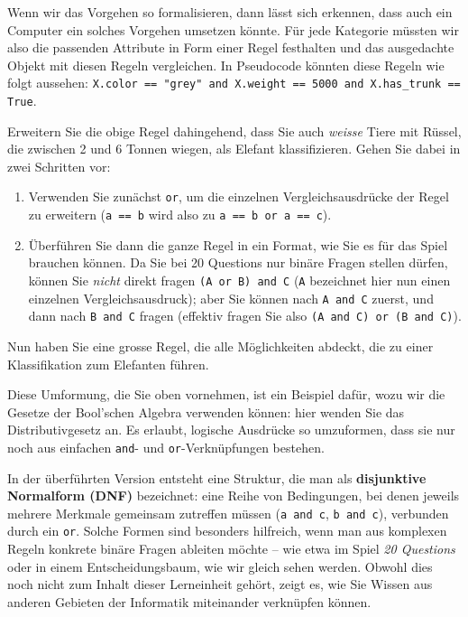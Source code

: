 \begin{lpu}
Wenn wir das Vorgehen so formalisieren, dann lässt sich erkennen, dass auch ein Computer ein solches Vorgehen umsetzen könnte. Für jede Kategorie müssten wir also die passenden Attribute in Form einer Regel festhalten und das ausgedachte Objekt mit diesen Regeln vergleichen. In Pseudocode könnten diese Regeln wie folgt aussehen: \noindent\colorbox{orange!10}{\texttt{X.color == "grey"\ and X.weight == 5000 and X.has\_trunk == True}}.

\newpage
\begin{aufgabe}{2}
Erweitern Sie die obige Regel dahingehend, dass Sie auch \textit{weisse} Tiere mit Rüssel, die zwischen 2 und 6 Tonnen wiegen, als Elefant klassifizieren. Gehen Sie dabei in zwei Schritten vor:
\begin{enumerate}
    \item Verwenden Sie zunächst \texttt{or}, um die einzelnen Vergleichsausdrücke der Regel zu erweitern (\texttt{a == b} wird also zu \texttt{a == b or a == c}).
    \item Überführen Sie dann die ganze Regel in ein Format, wie Sie es für das Spiel brauchen können. Da Sie bei 20 Questions nur binäre Fragen stellen dürfen, können Sie \textit{nicht} direkt fragen \texttt{(A or B) and C} (\texttt{A} bezeichnet hier nun einen einzelnen Vergleichsausdruck); aber Sie können nach \texttt{A and C} zuerst, und dann nach \texttt{B and C} fragen (effektiv fragen Sie also \texttt{(A and C) or (B and C)}).
\end{enumerate}
\end{aufgabe}

Nun haben Sie eine grosse Regel, die alle Möglichkeiten abdeckt, die zu einer Klassifikation zum Elefanten führen.

\begin{hinweis}
Diese Umformung, die Sie oben vornehmen, ist ein Beispiel dafür, wozu wir die Gesetze der Bool'schen Algebra verwenden können: hier wenden Sie das Distributivgesetz an. Es erlaubt, logische Ausdrücke so umzuformen, dass sie nur noch aus einfachen \texttt{and}- und \texttt{or}-Verknüpfungen bestehen.

In der überführten Version entsteht eine Struktur, die man als \textbf{disjunktive Normalform (DNF)} bezeichnet: eine Reihe von Bedingungen, bei denen jeweils mehrere Merkmale gemeinsam zutreffen müssen (\texttt{a and c}, \texttt{b and c}), verbunden durch ein \texttt{or}. Solche Formen sind besonders hilfreich, wenn man aus komplexen Regeln konkrete binäre Fragen ableiten möchte – wie etwa im Spiel \emph{20 Questions} oder in einem Entscheidungsbaum, wie wir gleich sehen werden. Obwohl dies noch nicht zum Inhalt dieser Lerneinheit gehört, zeigt es, wie Sie Wissen aus anderen Gebieten der Informatik miteinander verknüpfen können.
\end{hinweis}


\end{lpu}
